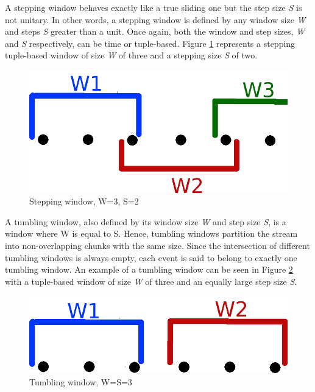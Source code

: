 A stepping window behaves exactly like a true sliding one but the step size \textit{S} is not unitary. In other words, a stepping window is defined by any window size \textit{W} and steps \textit{S} greater than a unit. Once again, both the window and step sizes, \textit{W} and \textit{S} respectively, can be time or tuple-based. Figure \ref{fig:stepping-window} represents a stepping tuple-based window of size \textit{W} of three and a stepping size \textit{S} of two.

\begin{figure}[!htb]
    \begin{center}
      \includegraphics[scale=0.3]{figures/stepping.png}
      \caption[Stepping window]{Stepping window, W=3, S=2}
      \label{fig:stepping-window}
    \end{center}
\end{figure}

A tumbling window, also defined by its window size \textit{W} and step size \textit{S}, is a window where W is equal to S. Hence, tumbling windows partition the stream into non-overlapping chunks with the same size. Since the intersection of different tumbling windows is always empty, each event is said to belong to exactly one tumbling window. An example of a tumbling window can be seen in Figure \ref{fig:tumbling-window} with a tuple-based window of size \textit{W} of three and an equally large step size \textit{S}.

\begin{figure}[!htb]
    \begin{center}
      \includegraphics[scale=0.3]{figures/tumbling.png}
      \caption[Tumbling window]{Tumbling window, W=S=3}
      \label{fig:tumbling-window}
    \end{center}
\end{figure}

